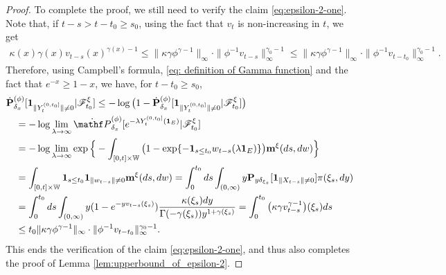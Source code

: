 \documentclass[12pt,a4paper]{amsart}
\theoremstyle{definition}
\numberwithin{equation}{section}
\begin{document}
\begin{proof}
To complete the proof, we still need to verify the claim \eqref{eq:epsilon-2-one}.
Note that, if $t-s > t-t_0 \geq s_0$, using the fact that $v_t$ is non-increasing in $t$, we get
\begin{align}
	\kappa(x)\gamma(x) v_{t-s}(x)^{\gamma(x)-1}
	\leq \|\kappa \gamma \phi^{\gamma - 1}\|_\infty \cdot \|\phi^{-1} v_{t-s}\|^{\gamma_0-1}_\infty
	\leq \|\kappa\gamma\phi^{\gamma - 1}\|_\infty \cdot \|\phi^{-1}v_{t-t_0}\|^{\gamma_0-1}_\infty.
\end{align}
Therefore, using Campbell's formula, \eqref{eq: definition of Gamma function} and the fact that $e^{-x} \geq 1-x$, we have,  for $t-t_0 \geq s_0$,
\begin{align}
	&\dot{\mathbf P}_{\delta_x}^{(\phi)}[\mathbf 1_{\| Y_t^{(0,t_0]}\|\neq 0}|\mathscr F^\xi_{t_0}]
   \leq - \log \big( 1- \dot{\mathbf P}_{\delta_x}^{(\phi)}[\mathbf 1_{ \| Y_t^{(0,t_0]}\|\neq 0}|\mathscr F^\xi_{t_0}]\big)
	\\&\quad =  - \log \lim_{\lambda \to \infty}\dot{\mathf P}_{\delta_x}^{(\phi)}[e^{- \lambda Y_t^{(0,t_0]}(\mathbf 1_E) }|\mathscr F^\xi_{t_0}]
	\\&\quad = -\log \lim_{\lambda \to \infty} \exp\Big\{- \int_{[0,t]\times \mathbb W} \big( 1-\exp\{- \mathbf 1_{s\leq t_0} w_{t-s}(\lambda \mathbf 1_E)\}  \big) \mathbf m^\xi(ds,dw)\Big\}
	\\&\quad = \int_{[0,t]\times \mathbb W}\mathbf 1_{s\leq t_0} \mathbf 1_{ \|w_{t-s}\| \neq 0} \mathbf m^\xi(ds,dw)
	= \int_0^{t_0} ds \int_{(0,\infty)} y\mathbf P_{y\delta_{\xi_s}}[\mathbf 1_{ \|X_{t-s}\| \neq 0}]\pi(\xi_s,dy)
	\\&\quad= \int_0^{t_0} ds \int_{(0,\infty)} y (1-e^{-yv_{t-s}(\xi_s)})  \frac{\kappa(\xi_s)dy}{\Gamma(-\gamma(\xi_s)) y^{1+\gamma(\xi_s)}}
	= \int_0^{t_0} \big( \kappa \gamma  v_{t-s}^{\gamma - 1} \big) (\xi_s)ds
	\\&\quad \leq  t_0\|\kappa \gamma \phi^{\gamma - 1}\|_\infty \cdot \|\phi^{-1}v_{t-t_0}\|^{\gamma_0-1}_\infty.
\end{align}
This ends the verification of the claim \eqref{eq:epsilon-2-one}, and thus also completes the proof of Lemma \ref{lem:upperbound_of_epsilon-2}.

\end{proof}
\end{document}
